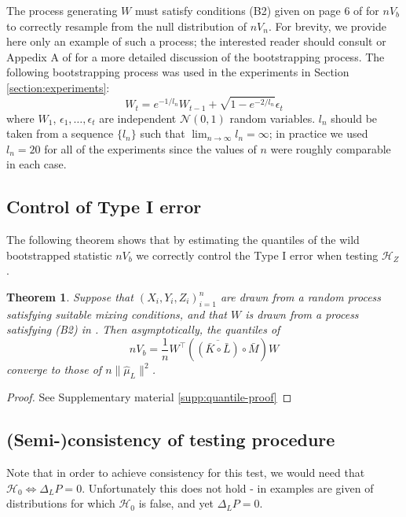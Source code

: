 \documentclass[]{article}
\newtheorem{theorem}{Theorem}
\begin{document}
The process generating $W$ must satisfy conditions (B2) given on page 6 of \citet{leucht2013dependent} for $nV_b$ to correctly resample from the null distribution of $nV_n$. For brevity, we provide here only an example of such a process; the interested reader should consult \citet{leucht2013dependent} or Appedix A of \citet{chwialkowski2014wild} for a more detailed discussion of the bootstrapping process. The following bootstrapping process was used in the experiments in Section \ref{section:experiments}:
\begin{equation}\label{equation:bootstrap}
W_t = e^{-1/l_n}W_{t-1} + \sqrt{1 - e^{-2/l_n}}\epsilon_t 
\end{equation}
where $W_1$, $\epsilon_1, \ldots, \epsilon_t$ are independent $\mathcal{N}(0,1)$ random variables. $l_n$ should be taken from a sequence $\{l_n\}$ such that $\lim_{n\longrightarrow\infty}l_n = \infty$; in practice we used $l_n=20$ for all of the experiments since the values of $n$ were roughly comparable in each case.
\subsection{Control of Type I error}

The following theorem shows that by estimating the quantiles of the wild bootstrapped statistic $nV_b$ we correctly control the Type I error when testing $\mathcal{H}_Z$.

\begin{theorem}\label{theorem:quantiles-converge}
Suppose that $(X_i,Y_i,Z_i)_{i=1}^n$ are drawn from a random process satisfying suitable mixing conditions, and that $W$ is drawn from a process satisfying (B2) in \citet{leucht2013dependent}. Then asymptotically, the quantiles of
\[nV_b = \frac{1}{n}W^\intercal\left( \overline{\left( \bar{K} \circ \bar{L}\right) }\circ \bar{M} \right)W\]
converge to those of $ n\| \hat \mu_L\|^2$. 
\end{theorem}

\begin{proof}
See Supplementary material \ref{supp:quantile-proof}
\end{proof}




\subsection{(Semi-)consistency of testing procedure}

Note that in order to achieve consistency for this test, we would need that $\mathcal{H}_0 \iff \Delta_LP = 0$. Unfortunately this does not hold - in \citet{sejdinovic2013kernel} examples are given of distributions for which $\mathcal{H}_0$ is false, and yet $\Delta_LP = 0$. 
\end{document}
